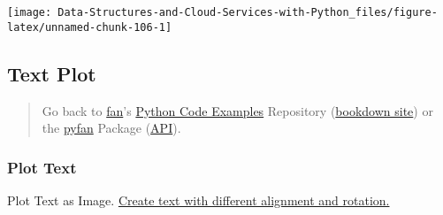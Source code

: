 \documentclass[
]{book}
\begin{document}
\begin{center}\texttt{[image: Data-Structures-and-Cloud-Services-with-Python\_files/figure-latex/unnamed-chunk-106-1]} \end{center}

\hypertarget{text-plot}{%
\subsection{Text Plot}\label{text-plot}}

\begin{quote}
Go back to \href{http://fanwangecon.github.io/}{fan}'s \href{https://fanwangecon.github.io/Py4Econ/}{Python Code Examples} Repository (\href{https://fanwangecon.github.io/Py4Econ/bookdown}{bookdown site}) or the \href{https://pyfan.readthedocs.io/en/latest/}{pyfan} Package (\href{https://pyfan.readthedocs.io/en/latest/reference.html}{API}).
\end{quote}

\hypertarget{plot-text}{%
\subsubsection{Plot Text}\label{plot-text}}

Plot Text as Image. \href{https://matplotlib.org/3.1.1/gallery/pyplots/text_layout.html\#sphx-glr-gallery-pyplots-text-layout-py}{Create text with different alignment and rotation.}
\end{document}
